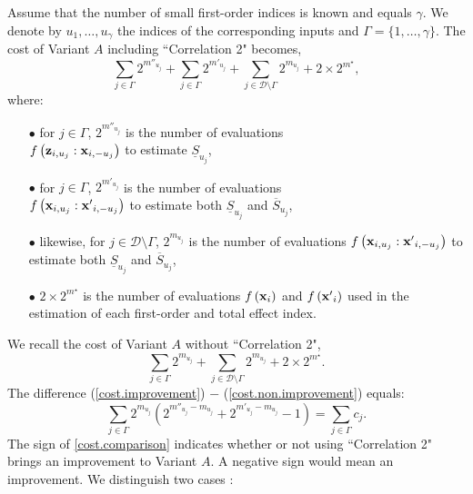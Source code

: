 Assume that the number of small first-order indices is known and equals $\gamma$. We denote by $u_1,\dots,u_{\gamma}$ the indices of the corresponding inputs and $\Gamma = \{1,\dots,\gamma\}$. The cost of Variant $A$ including ``Correlation 2" becomes, 
\begin{equation}
\sum \limits_{j \in \Gamma} 2^{m''_{u_j}} + \sum \limits_{j \in \Gamma} 2^{m'_{u_j}} + \sum \limits_{j \in \mathcal{D}\setminus{\Gamma}} 2^{m_{u_j}} + 2 \times 2^{m^\star},
\label{cost.improvement}
\end{equation}
where: %
\begin{itemize}
\item[$\bullet$] for $j\in \Gamma$, $2^{m''_{u_j}}$ is the number of evaluations \\ $f\left(\boldsymbol{\mathbf{z}}_{i,u_j}:\boldsymbol{\mathbf{x}}_{i,-u_j}\right)$ to estimate $\underline{S}_{u_j}$,
\item[$\bullet$] for $j\in \Gamma$, $2^{m'_{u_j}}$ is the number of evaluations \\ $f\left(\boldsymbol{\mathbf{x}}_{i,u_j}:{\boldsymbol{\mathbf{x}}'}_{i,-u_j}\right)$ to estimate both $\underline{S}_{u_j}$ and  $\overline{S}_{u_j}$,
\item[$\bullet$] likewise, for $j\in \mathcal{D}\setminus{\Gamma}$, $ 2^{m_{u_j}}$ is the number of evaluations $f\left(\boldsymbol{\mathbf{x}}_{i,u_j}:{\boldsymbol{\mathbf{x}}'}_{i,-u_j}\right)$ to estimate both $\underline{S}_{u_j}$ and  $\overline{S}_{u_j}$,
\item[$\bullet$] $2 \times 2^{m^{\star}}$ is the number of evaluations $f\left(\boldsymbol{\mathbf{x}}_{i}\right)$ and $f\left({\boldsymbol{\mathbf{x}}'}_{i}\right)$ used in the estimation of each first-order and total effect index.
\end{itemize}
We recall the cost of Variant $A$ without  ``Correlation 2",
\begin{equation}
\sum \limits_{j \in \Gamma} 2^{m_{u_j}} + \sum \limits_{j \in \mathcal{D}\setminus{\Gamma}} 2^{m_{u_j}} + 2 \times 2^{m^{\star}}. 
\label{cost.non.improvement}
\end{equation}
The difference (\ref{cost.improvement}) $-$ (\ref{cost.non.improvement}) equals:
\begin{equation}
 \sum \limits_{j \in \Gamma} 2^{m_{u_j}} \left(2^{m''_{u_j}-m_{u_j}}  + 2^{m'_{u_j}-m_{u_j}} - 1 \right) = \sum \limits_{j \in \Gamma} c_j.
\label{cost.comparison}
\end{equation}
The sign of \eqref{cost.comparison} indicates whether or not using ``Correlation 2" brings an improvement to Variant $A$. A negative sign would mean an improvement. We distinguish two cases :
